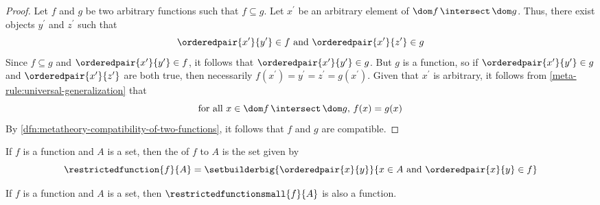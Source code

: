 \begin{proof}
    Let \( f \) and \( g \) be two arbitrary functions such that \( f \subseteq g \).
    Let \( x^{\prime} \) be an arbitrary element of \( \dom f \,{\intersect}\, \dom g \).
    Thus, there exist objects \( y^{\prime} \) and \( z^{\prime} \) such that
    \begin{equation*}
        \orderedpair{x^{\prime}}{y^{\prime}} \in f \ \text{and} \ \orderedpair{x^{\prime}}{z^{\prime}} \in g
    \end{equation*}
    Since \( f \subseteq g \) and \( \orderedpair{x^{\prime}}{y^{\prime}} \in f \), it follows that
    \( \orderedpair{x^{\prime}}{y^{\prime}} \in g \).
    But \( g \) is a function, so if \( \orderedpair{x^{\prime}}{y^{\prime}} \in g \) and \( \orderedpair{x^{\prime}}{z^{\prime}} \)
    are both true, then necessarily \( f(x^{\prime}) = y^{\prime} = z^{\prime} = g(x^{\prime}) \).
    Given that \( x^{\prime} \) is arbitrary, it follows from \cref{meta-rule:universal-generalization} that
    \begin{equation*}
        \text{for all \( x \in \dom f \,{\intersect}\, \dom g \), \( f(x) = g(x) \)}
    \end{equation*}
    By \cref{dfn:metatheory-compatibility-of-two-functions}, it follows that \( f \) and \( g \) are compatible. 
\end{proof}

\begin{dfn}[Restriction]
     \label{dfn:metatheory-restricted-function}
    If \( f \) is a function and \( A \) is a set, then the  of \( f \) to \( A \) is the set given by
    \begin{equation*}
        \restrictedfunction{f}{A} = \setbuilderbig{\orderedpair{x}{y}}{x \in A \ \text{and} \ \orderedpair{x}{y} \in f}
    \end{equation*}
\end{dfn}

\begin{thm}
     \label{thm:metatheory-restriction-is-a-function}
    If \( f \) is a function and \( A \) is a set, then \( \restrictedfunctionsmall{f}{A} \) is also a function.
\end{thm}

